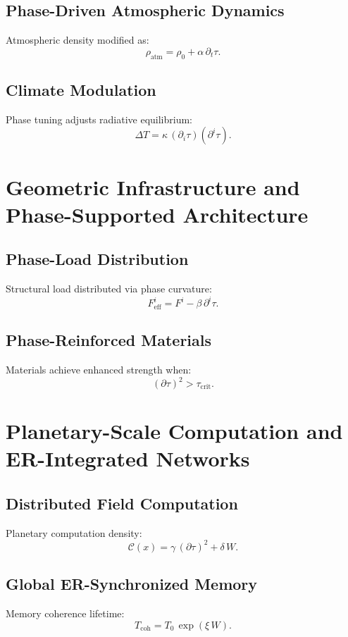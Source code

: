 \section{Phase-Driven Atmospheric Dynamics}
Atmospheric density modified as:
\[
\rho_{\mathrm{atm}} = \rho_0 + \alpha\,\partial_t\tau.
\]

\section{Climate Modulation}
Phase tuning adjusts radiative equilibrium:
\[
\Delta T = \kappa\,(\partial_i \tau)(\partial^i \tau).
\]

\chapter{Geometric Infrastructure and Phase-Supported Architecture}

\section{Phase-Load Distribution}
Structural load distributed via phase curvature:
\[
F^i_{\mathrm{eff}} = F^i - \beta\,\partial^i\tau.
\]

\section{Phase-Reinforced Materials}
Materials achieve enhanced strength when:
\[
(\partial\tau)^2 > \tau_{\mathrm{crit}}.
\]

\chapter{Planetary-Scale Computation and ER-Integrated Networks}

\section{Distributed Field Computation}
Planetary computation density:
\[
\mathcal{C}(x)=\gamma\,(\partial\tau)^2 + \delta\,W.
\]

\section{Global ER-Synchronized Memory}
Memory coherence lifetime:
\[
T_{\mathrm{coh}} = T_0\,\exp(\xi\, W).
\]
